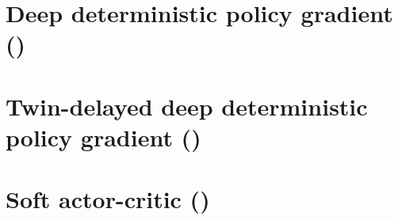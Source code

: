 \section{Deep deterministic policy gradient (\ddpg)}

\section{Twin-delayed deep deterministic policy gradient (\ddpg)}

\section{Soft actor-critic (\sac)}

